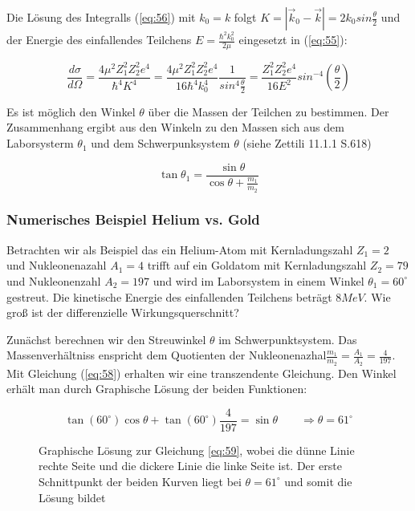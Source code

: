 Die Lösung des Integralls (\ref{eq:56}) mit \(k_0=k\) folgt \(K = |\vec k_0-\vec k| = 2k_0 sin\frac{\theta}{2} \) und  der Energie des einfallendes Teilchens \(E=\frac{\hbar^2k_0^2}{2\mu}\)  eingesetzt in (\ref{eq:55}):

\begin{equation}
  \label{eq:57}
  \frac{d\sigma}{d\Omega}=  \frac{4\mu^2Z_1^2Z_2^2e^4}{\hbar^4 K^4} = \frac{4\mu^2Z_1^2Z_2^2e^4}{16 \hbar^4 k_0^4}\frac{1}{sin^4\frac{\theta}{2} } = \frac{Z_1^2Z_2^2e^4}{16 E^2}sin^{-4}(\frac{\theta}{2})
\end{equation}


Es ist möglich den Winkel \(\theta\) über die Massen der Teilchen zu bestimmen. Der Zusammenhang ergibt aus den Winkeln  zu den Massen sich aus dem Laborsysterm \(\theta_1\) und dem Schwerpunksystem \(\theta\) (siehe Zettili 11.1.1 S.618)

\begin{equation}
  \label{eq:58}
  \tan\theta_1=\frac{\sin\theta}{\cos\theta+\frac{m_1}{m_2}}
\end{equation}

\subsubsection*{Numerisches Beispiel Helium vs. Gold}

Betrachten wir als Beispiel das ein Helium-Atom mit Kernladungszahl \(Z_1=2\) und Nukleonenazahl \(A_1 = 4\) trifft auf ein Goldatom mit Kernladungszahl \(Z_2=79\) und Nukleonenzahl \(A_2 = 197\) und wird im Laborsystem in einem Winkel  \(\theta_1=60^\circ\) gestreut. Die kinetische Energie des einfallenden Teilchens beträgt \(8MeV\). Wie groß ist der differenzielle Wirkungsquerschnitt?

Zunächst berechnen wir den Streuwinkel \(\theta\) im Schwerpunktsystem. Das Massenverhältniss enspricht dem Quotienten der Nukleonenazhal\(\frac{m_1}{m_2}=\frac{A_1}{A_2}=\frac{4}{197} \). Mit Gleichung (\ref{eq:58}) erhalten wir eine transzendente Gleichung. Den Winkel erhält man durch Graphische Lösung der beiden Funktionen:

\begin{equation}
  \label{eq:59}
  \tan(60^\circ)\cos\theta+ \tan(60^\circ)\frac{4}{197}  = \sin\theta \qquad\Rightarrow \theta=61^\circ
\end{equation}





\begin{figure}
  \centering
  
  \caption{Graphische Lösung zur Gleichung \eqref{eq:59}, wobei die dünne Linie rechte Seite und die dickere Linie die linke Seite ist.  Der erste Schnittpunkt der beiden Kurven liegt bei \(\theta=61^\circ\) und somit die Lösung bildet}
  \label{fig:1}
\end{figure}


